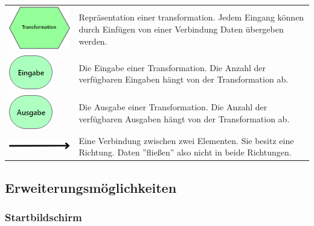 \documentclass[parskip=full]{scrartcl}
\begin{document}
\begin{tabular}[t]{p{1cm} p{10cm}}
	\vspace{0cm}\includegraphics[width = 1 cm]{Grafik/Verbindungselement.png} & Repräsentation einer \gls{transformation}. Jedem Eingang können durch Einfügen von einer Verbindung Daten übergeben werden.\newline\\
	\vspace{0cm}\includegraphics[width = 1 cm]{Grafik/Eingabe-Verbindung.png} & Die Eingabe einer Transformation. Die Anzahl der verfügbaren Eingaben hängt von der Transformation ab.\newline\\
	\vspace{0cm}\includegraphics[width = 1 cm]{Grafik/Ausgabe-Transformation.png} & Die Ausgabe einer Transformation. Die Anzahl der verfügbaren Ausgaben hängt von der Transformation ab.\newline\\\cline{1-2}
	\vspace{0cm}\includegraphics[width = 1 cm]{Grafik/Verbindungspfeil.png} & Eine Verbindung zwischen zwei Elementen. Sie besitz eine Richtung. Daten ''fließen'' also nicht in beide Richtungen.\newline\\
\end{tabular}

\clearpage

\subsection{Erweiterungsmöglichkeiten}

\subsubsection{Startbildschirm}
\end{document}
